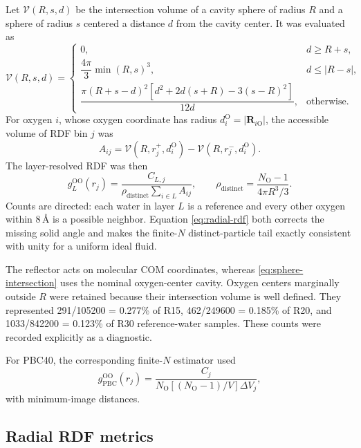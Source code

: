 \documentclass[11pt]{article}
\newcommand{\angstrom}{\text{\AA}}
\newcommand{\PBC}{\mathrm{PBC}}
\newcommand{\OO}{\mathrm{OO}}
\begin{document}
Let \(\mathcal V(R,s,d)\) be the intersection volume of a cavity sphere of
radius \(R\) and a sphere of radius \(s\) centered a distance \(d\) from the
cavity center.  It was evaluated as
\begin{equation}
\mathcal V(R,s,d)=
\begin{cases}
0, & d\geq R+s,\\[2mm]
\dfrac{4\pi}{3}\min(R,s)^3, & d\leq |R-s|,\\[3mm]
\dfrac{\pi(R+s-d)^2
\left[d^2+2d(s+R)-3(s-R)^2\right]}{12d}, & \text{otherwise}.
\end{cases}
\label{eq:sphere-intersection}
\end{equation}
For oxygen \(i\), whose oxygen coordinate has radius
\(d_i^{\mathrm O}=|\bm R_{i\mathrm O}|\), the accessible volume of RDF bin
\(j\) was
\begin{equation}
 A_{ij}=\mathcal V(R,r_j^+,d_i^{\mathrm O})
       -\mathcal V(R,r_j^-,d_i^{\mathrm O}).
 \label{eq:accessible-shell}
\end{equation}
The layer-resolved RDF was then
\begin{equation}
 g_{L}^{\OO}(r_j)=
 \frac{C_{L,j}}
 {\rho_{\mathrm{distinct}}
  \sum_{i\in L} A_{ij}},
 \qquad
 \rho_{\mathrm{distinct}}=\frac{N_{\mathrm O}-1}{4\pi R^3/3}.
 \label{eq:radial-rdf}
\end{equation}
Counts are directed: each water in layer \(L\) is a reference and every other
oxygen within \(8\,\angstrom\) is a possible neighbor.  Equation
\eqref{eq:radial-rdf} both corrects the missing solid angle and makes the
finite-\(N\) distinct-particle tail exactly consistent with unity for a
uniform ideal fluid.

The reflector acts on molecular COM coordinates, whereas
\cref{eq:sphere-intersection} uses the nominal oxygen-center cavity.  Oxygen
centers marginally outside \(R\) were retained because their intersection
volume is well defined.  They represented 291/105200 = 0.277\% of R15,
462/249600 = 0.185\% of R20, and 1033/842200 = 0.123\% of R30 reference-water
samples.  These counts were recorded explicitly as a diagnostic.

For PBC40, the corresponding finite-\(N\) estimator used
\begin{equation}
 g_{\PBC}^{\OO}(r_j)=
 \frac{C_j}{N_{\mathrm O}[(N_{\mathrm O}-1)/V]\Delta V_j},
 \label{eq:pbc-radial-rdf}
\end{equation}
with minimum-image distances.

\subsection{Radial RDF metrics}
\end{document}
